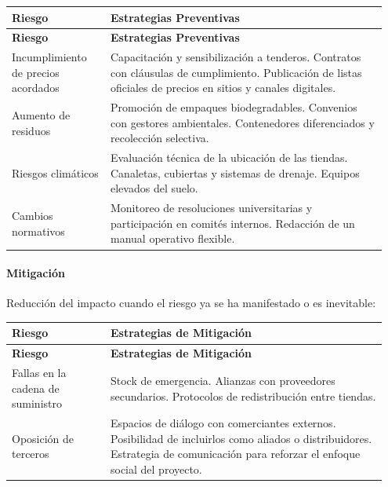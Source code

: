 \documentclass[letterpaper, 11pt]{report}
\begin{document}
\begin{longtable}{|p{0.25\linewidth}|p{0.7\linewidth}|}
\hline
\textbf{Riesgo} & \textbf{Estrategias Preventivas} \\
\hline
\endfirsthead

\hline
\textbf{Riesgo} & \textbf{Estrategias Preventivas} \\
\hline
\endhead

\hline
\endfoot

\hline
\endlastfoot

Incumplimiento de precios acordados & Capacitación y sensibilización a tenderos. Contratos con cláusulas de cumplimiento. Publicación de listas oficiales de precios en sitios y canales digitales. \\
\hline
Aumento de residuos & Promoción de empaques biodegradables. Convenios con gestores ambientales. Contenedores diferenciados y recolección selectiva. \\
\hline
Riesgos climáticos & Evaluación técnica de la ubicación de las tiendas. Canaletas, cubiertas y sistemas de drenaje. Equipos elevados del suelo. \\
\hline
Cambios normativos & Monitoreo de resoluciones universitarias y participación en comités internos. Redacción de un manual operativo flexible. \\
\hline
\end{longtable}

\paragraph{Mitigación}\hfill{}\break{}
Reducción del impacto cuando el riesgo ya se ha manifestado o es inevitable:

\begin{longtable}{|p{0.25\linewidth}|p{0.7\linewidth}|}
\hline
\textbf{Riesgo} & \textbf{Estrategias de Mitigación} \\
\hline
\endfirsthead

\hline
\textbf{Riesgo} & \textbf{Estrategias de Mitigación} \\
\hline
\endhead

\hline
\endfoot

\hline
\endlastfoot

Fallas en la cadena de suministro & Stock de emergencia. Alianzas con proveedores secundarios. Protocolos de redistribución entre tiendas. \\
\hline
Oposición de terceros & Espacios de diálogo con comerciantes externos. Posibilidad de incluirlos como aliados o distribuidores. Estrategia de comunicación para reforzar el enfoque social del proyecto. \\
\hline
\end{longtable}
\end{document}
